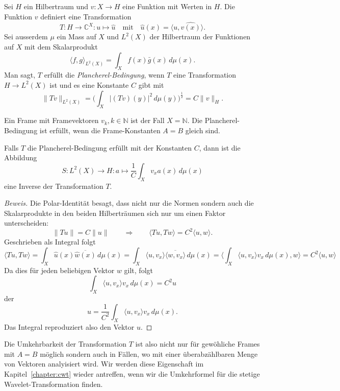 \begin{definition}
Sei $H$ ein Hilbertraum und
$v\colon X\to H$ eine Funktion mit Werten in $H$.
Die Funktion $v$ definiert eine Transformation
\[
T\colon  H \to \mathbb C^X : u \mapsto \hat{u}
\quad\text{mit}\quad
\hat{u}(x) = \langle u,\hat{v(x)}\rangle.
\]
Sei ausserdem $\mu$ ein Mass auf $X$ und $L^2(X)$ der Hilbertraum
der Funktionen auf $X$ mit dem Skalarprodukt
\[
\langle f,g\rangle_{L^2(X)} = \int_X f(x) \bar{g}(x)\,d\mu(x).
\]
Man sagt, $T$ erfüllt die {\em Plancherel-Bedingung}, wenn $T$
eine Transformation $H\to L^2(X)$ ist und es eine Konstante $C$
gibt mit
\[
\| Tv \|_{L^2(X)}
=
\biggl(
\int_{X} |(Tv)(y)|^2 \, d\mu(y)
\biggr)^{\frac12}
=
C \|v\|_H.
\]
\end{definition}

Ein Frame mit Framevektoren $v_k, k\in\mathbb N$ 
ist der Fall $X=\mathbb N$. Die Plancherel-Bedingung ist erfüllt, wenn
die Frame-Konstanten $A=B$ gleich sind.

\begin{satz}
\label{satz:plancherel-prinzip}
Falls $T$ die Plancherel-Bedingung erfüllt mit der Konstanten $C$, dann ist
die Abbildung
\[
S
\colon
L^2(X) \to H
:
a \mapsto \frac{1}{C}\int_X v_x a(x) \,d\mu(x)
\]
eine Inverse der Transformation $T$.
\end{satz}

\begin{proof}[Beweis]
Die Polar-Identität besagt, dass nicht nur die Normen sondern auch die
Skalarprodukte in den beiden Hilberträumen sich nur um einen Faktor
unterscheiden:
\[
\| Tu \| = C \| u \|
\qquad\Rightarrow\qquad
\langle Tu,Tw\rangle = C^2 \langle u,w\rangle.
\]
Geschrieben als Integral folgt
\[
\langle Tu,Tw\rangle
=
\int_X \hat{u}(x) \overline{\hat{w}(x)} \,d\mu(x)
=
\int_X \langle u,v_x\rangle \overline{\langle w,v_x\rangle}\,d\mu(x)
=
\biggl\langle
\int_X \langle u,v_x\rangle v_x\,d\mu(x),
w
\biggr\rangle
=
C^2
\langle u,w\rangle
\]
Da dies für jeden beliebigen Vektor $w$ gilt, folgt 
\[
\int_X \langle u,v_x\rangle v_x\,d\mu(x) = C^2 u
\]
der
\[
u = \frac{1}{C^2}\int_X \langle u,v_x\rangle v_x\,d\mu(x).
\]
Das Integral reproduziert also den Vektor $u$.
\end{proof}

Die Umkehrbarkeit der Transformation $T$ ist also nicht nur für gewöhliche
Frames mit $A=B$ möglich sondern auch in Fällen, wo mit einer überabzählbaren
Menge von Vektoren analyisiert wird.
Wir werden diese Eigenschaft im Kapitel~\ref{chapter:cwt} wieder antreffen,
wenn wir die Umkehrformel für die stetige Wavelet-Transformation finden.





